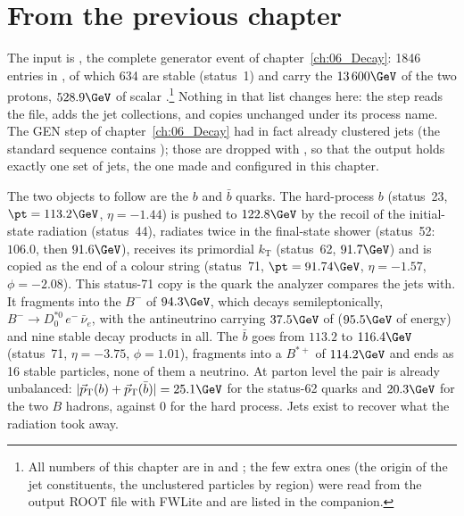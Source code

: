 \section{From the previous chapter}

The input is , the complete generator event of
chapter~\ref{ch:06_Decay}: 1846 entries in , of which 634 are stable (status~1) and carry
the $13\,600\GeV$ of the two protons, $528.9\GeV$ of scalar \pt{}.\footnote{All numbers of this chapter are
in  and ; the few extra
ones (the origin of the jet constituents, the unclustered particles by region) were read from the output ROOT
file with FWLite and are listed in the companion.} Nothing in that list changes here: the  step
reads the file, adds the jet collections, and copies  unchanged under its 
process name. The GEN step of chapter~\ref{ch:06_Decay} had in fact already clustered jets (the standard
 sequence contains ); those are dropped with
, so that the output holds
exactly one set of jets, the one made and configured in this chapter.

The two objects to follow are the $b$ and $\bar b$ quarks. The hard-process $b$ (status~23,
$\pt=113.2\GeV$, $\eta=-1.44$) is pushed to $122.8\GeV$ by the recoil of the initial-state radiation
(status~44), radiates twice in the final-state shower (status~52: $106.0$, then $91.6\GeV$), receives its
primordial $k_{\mathrm{T}}$ (status~62, $91.7\GeV$) and is copied as the end of a colour string (status~71,
$\pt=91.74\GeV$, $\eta=-1.57$, $\phi=-2.08$). This status-71 copy is the quark the analyzer compares the
jets with. It fragments into the $B^-$ of $94.3\GeV$, which decays semileptonically,
$B^-\to D_0^{*0}\,e^-\,\bar\nu_e$, with the antineutrino carrying $37.5\GeV$ of \pt{} ($95.5\GeV$ of energy)
and nine stable decay products in all. The $\bar b$ goes from $113.2$ to $116.4\GeV$ (status~71,
$\eta=-3.75$, $\phi=1.01$), fragments into a $B^{*+}$ of $114.2\GeV$ and ends as 16 stable particles, none
of them a neutrino. At parton level the pair is already unbalanced: $|\vec p_{\mathrm T}(b)+\vec p_{\mathrm
T}(\bar b)|=25.1\GeV$ for the status-62 quarks and $20.3\GeV$ for the two $B$ hadrons, against $0$ for the
hard process. Jets exist to recover what the radiation took away.


